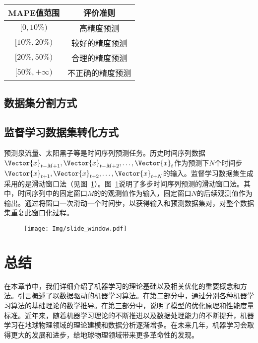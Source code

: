 \begin{table}[!htbp]
    \label{tab:MAPE_Criteria}
    \centering
    \footnotesize%
    \setlength{\tabcolsep}{4pt}
    \renewcommand{\arraystretch}{1.2}%
    \begin{tabular}{cc}
        \hline
        MAPE值范围 & 评价准则\\
        \hline
        $[0,10\%)$ & 高精度预测  \\
        $[10\%,20\%)$ & 较好的精度预测  \\
        $[20\%,50\%)$ & 合理的精度预测  \\
        $[50\%,+\infty)$ & 不正确的精度预测  \\
        \hline
    \end{tabular}
\end{table}


\subsection{数据集分割方式}

\subsection{监督学习数据集转化方式}
预测泉流量、太阳黑子等是时间序列预测任务。历史时间序列数据$\Vector{x}_{t-M+1},\Vector{x}_{t-M+2},\ldots,\Vector{x}_{t}$作为预测下$N$个时间步$\Vector{x}_{t+1},\Vector{x}_{t+2},\ldots,\Vector{x}_{t+N}$的输入。监督学习数据集生成采用的是滑动窗口法（见图~\ref{fig:slide_window}）。图~\ref{fig:slide_window}说明了多步时间序列预测的滑动窗口法。其中，时间序列中的固定窗口$M$的的观测值作为输入，固定窗口$N$的后续观测值作为输出。通过将窗口一次滑动一个时间步，以获得输入和预测数据集对，对整个数据集重复此窗口化过程。

\begin{figure}[!htbp]
    \centering
    \texttt{[image: Img/slide\_window.pdf]}
    \label{fig:slide_window}
\end{figure}

\section{总结}\label{sec:ann_总结}

在本章节中，我们详细介绍了机器学习的理论基础以及相关优化的重要概念和方法。引言概述了以数据驱动的机器学习算法。在第二部分中，通过分别各种机器学习算法的基础理论的数学推导。在第三部分中，说明了模型的优化原理和性能度量标准。近年来，随着机器学习理论的不断推进以及数据处理能力的不断提升，机器学习在地球物理领域的理论建模和数据分析逐渐增多。在未来几年，机器学习会取得更大的发展和进步，给地球物理领域带来更多革命性的发现。